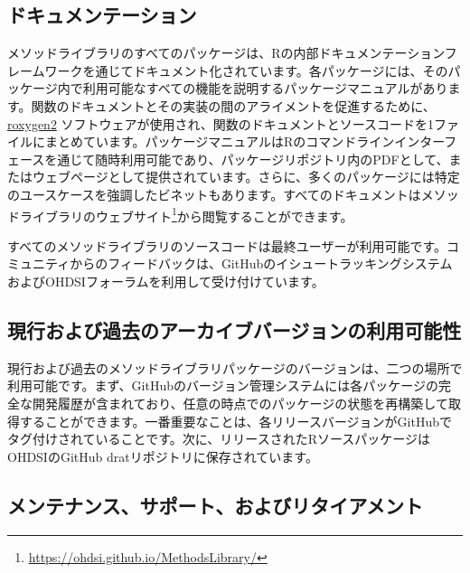 \documentclass[
  11pt]{book}
\theoremstyle{definition}
\theoremstyle{definition}
\theoremstyle{definition}
\theoremstyle{definition}
\theoremstyle{remark}
\begin{document}
\subsection{ドキュメンテーション}\label{ux30c9ux30adux30e5ux30e1ux30f3ux30c6ux30fcux30b7ux30e7ux30f3}

メソッドライブラリのすべてのパッケージは、Rの内部ドキュメンテーションフレームワークを通じてドキュメント化されています。各パッケージには、そのパッケージ内で利用可能なすべての機能を説明するパッケージマニュアルがあります。関数のドキュメントとその実装の間のアライメントを促進するために、\href{https://cran.r-project.org/web/packages/roxygen2/vignettes/roxygen2.html}{roxygen2} ソフトウェアが使用され、関数のドキュメントとソースコードを1ファイルにまとめています。パッケージマニュアルはRのコマンドラインインターフェースを通じて随時利用可能であり、パッケージリポジトリ内のPDFとして、またはウェブページとして提供されています。さらに、多くのパッケージには特定のユースケースを強調したビネットもあります。すべてのドキュメントはメソッドライブラリのウェブサイト\footnote{\url{https://ohdsi.github.io/MethodsLibrary/}}から閲覧することができます。

すべてのメソッドライブラリのソースコードは最終ユーザーが利用可能です。コミュニティからのフィードバックは、GitHubのイシュートラッキングシステムおよびOHDSIフォーラムを利用して受け付けています。

\subsection{現行および過去のアーカイブバージョンの利用可能性}\label{ux73feux884cux304aux3088ux3073ux904eux53bbux306eux30a2ux30fcux30abux30a4ux30d6ux30d0ux30fcux30b8ux30e7ux30f3ux306eux5229ux7528ux53efux80fdux6027}

現行および過去のメソッドライブラリパッケージのバージョンは、二つの場所で利用可能です。まず、GitHubのバージョン管理システムには各パッケージの完全な開発履歴が含まれており、任意の時点でのパッケージの状態を再構築して取得することができます。一番重要なことは、各リリースバージョンがGitHubでタグ付けされていることです。次に、リリースされたRソースパッケージはOHDSIのGitHub dratリポジトリに保存されています。

\subsection{メンテナンス、サポート、およびリタイアメント}\label{ux30e1ux30f3ux30c6ux30caux30f3ux30b9ux30b5ux30ddux30fcux30c8ux304aux3088ux3073ux30eaux30bfux30a4ux30a2ux30e1ux30f3ux30c8}
\end{document}
